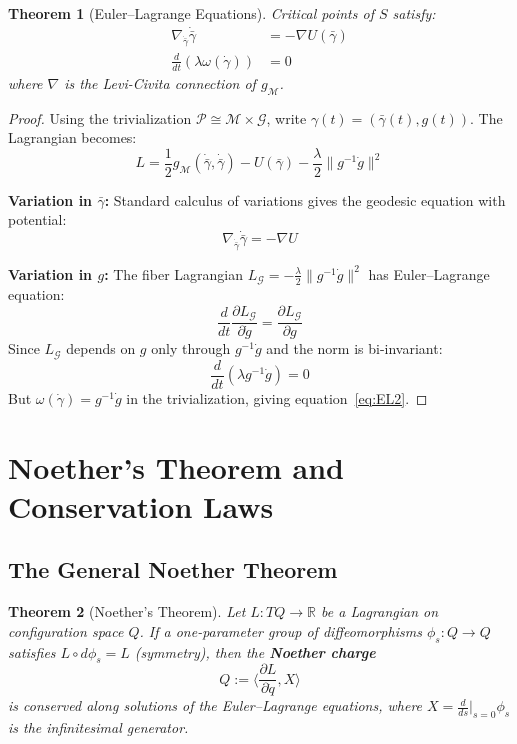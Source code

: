 \documentclass[11pt]{article}
\newtheorem{theorem}{Theorem}[section]
\begin{document}
\begin{theorem}[Euler--Lagrange Equations]
Critical points of $S$ satisfy:
\begin{align}
\nabla_{\dot{\bar{\gamma}}} \dot{\bar{\gamma}} &= -\nabla U(\bar{\gamma}) \label{eq:EL1} \\
\frac{d}{dt}(\lambda \omega(\dot{\gamma})) &= 0 \label{eq:EL2}
\end{align}
where $\nabla$ is the Levi-Civita connection of $g_{\mathcal{M}}$.
\end{theorem}

\begin{proof}
Using the trivialization $\mathcal{P} \cong \mathcal{M} \times \mathcal{G}$, write $\gamma(t) = (\bar{\gamma}(t), g(t))$.
The Lagrangian becomes:
\[
L = \frac{1}{2} g_{\mathcal{M}}(\dot{\bar{\gamma}}, \dot{\bar{\gamma}}) - U(\bar{\gamma}) - \frac{\lambda}{2}\|g^{-1}\dot{g}\|^2
\]

\textbf{Variation in $\bar{\gamma}$:} Standard calculus of variations gives the geodesic equation with potential:
\[
\nabla_{\dot{\bar{\gamma}}} \dot{\bar{\gamma}} = -\nabla U
\]

\textbf{Variation in $g$:} The fiber Lagrangian $L_{\mathcal{G}} = -\frac{\lambda}{2}\|g^{-1}\dot{g}\|^2$ has Euler--Lagrange equation:
\[
\frac{d}{dt}\frac{\partial L_{\mathcal{G}}}{\partial \dot{g}} = \frac{\partial L_{\mathcal{G}}}{\partial g}
\]
Since $L_{\mathcal{G}}$ depends on $g$ only through $g^{-1}\dot{g}$ and the norm is bi-invariant:
\[
\frac{d}{dt}(\lambda g^{-1} \dot{g}) = 0
\]
But $\omega(\dot{\gamma}) = g^{-1}\dot{g}$ in the trivialization, giving equation~\eqref{eq:EL2}.
\end{proof}

\section{Noether's Theorem and Conservation Laws}

\subsection{The General Noether Theorem}

\begin{theorem}[Noether's Theorem]
\label{thm:noether}
Let $L : TQ \to \mathbb{R}$ be a Lagrangian on configuration space
$Q$. If a one-parameter group of diffeomorphisms $\phi_s : Q \to Q$ satisfies $L \circ d\phi_s = L$ (symmetry),
then the \textbf{Noether charge}
\[
Q := \langle \frac{\partial L}{\partial \dot{q}}, X \rangle
\]
is conserved along solutions of the Euler--Lagrange equations, where $X = \frac{d}{ds}\big|_{s=0} \phi_s$ is the infinitesimal generator.
\end{theorem}
\end{document}
